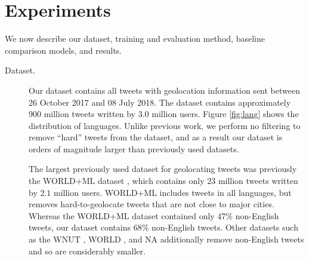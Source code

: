 \documentclass[sigconf,anonymous,review,10pt]{acmart}
\renewcommand{\times}{\mathbin{\tikz [x=1.4ex,y=1.4ex,line width=.1ex] \draw (0,0) -- (1,1) (0,1) -- (1,0);}}%
\begin{document}

\section{Experiments}
\label{sec:experiments}

We now describe our dataset, 
training and evaluation method, 
baseline comparison models, 
and results.

\begin{description}

\item[Dataset.]
Our dataset contains all tweets with geolocation information sent between 26 October 2017 and 08 July 2018.
The dataset contains approximately 900 million tweets written by $3.0$ million users.
Figure \ref{fig:lang} shows the distribution of languages.
Unlike previous work, 
we perform no filtering to remove ``hard'' tweets from the dataset,
and as a result our dataset is orders of magnitude larger than previously used datasets.

The largest previously used dataset for geolocating tweets was previously the WORLD+ML dataset \citep{han2014text},
which contains only $23$ million tweets written by $2.1$ million users.
WORLD+ML includes tweets in all languages,
but removes hard-to-geolocate tweets that are not close to major cities.
Whereas the WORLD+ML dataset contained only 47\% non-English tweets,
our dataset contains 68\% non-English tweets.
Other datasets such as the WNUT \citep{han2016twitter}, WORLD \citep{han2012geolocation}, and NA \citep{roller2012supervised}
additionally remove non-English tweets and so are considerably smaller.


\end{description}
\end{document}
